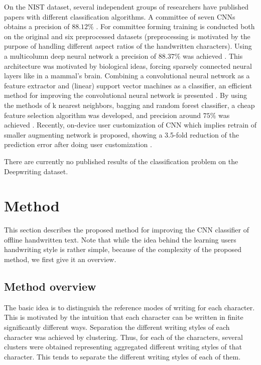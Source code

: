 \documentclass{article}
\begin{document}
On the NIST dataset, several independent groups of researchers have published papers with different classification algorithms.
A committee of seven CNNs obtains a precision of $88.12\%$ \citep{nist1}.
For committee forming training is conducted both on the original and six preprocessed datasets
(preprocessing is motivated by the purpose of handling different aspect ratios of the handwritten characters).
Using a multicolumn deep neural network a precision of $88.37\%$ was achieved \citep{nist2}.
This architecture was motivated by biological ideas, forcing sparsely connected neural layers like in a mammal's brain.
Combining a convolutional neural network as a feature extractor and (linear) support vector machines as a classifier,
an efficient method for improving the convolutional neural network is presented \citep{nist3}.
By using the methods of k nearest neighbors, bagging and random forest classifier, a cheap feature selection algorithm was developed,
and precision around $75\%$ was achieved \citep{nist4}.
Recently, on-device user customization of CNN which implies retrain of smaller augmenting network is proposed,
showing a 3.5-fold reduction of the prediction error after doing user customization \citep{nist5}.

There are currently no published results of the classification problem on the Deepwriting dataset.

\section{Method}

This section describes the proposed method for improving the CNN classifier of offline handwritten text.
Note that while the idea behind the learning users handwriting style is rather simple, because of the complexity of the proposed method, we first give it an overview.

\subsection{Method overview}

The basic idea is to distinguish the reference modes %
of writing for each character.
This is motivated by the intuition that each character can be written in finite significantly different ways.
Separation the different writing styles of each character was achieved by clustering.
Thus, for each of the characters, several clusters were obtained representing aggregated different writing styles of that character.
This tends to separate the different writing styles of each of them.
\end{document}
